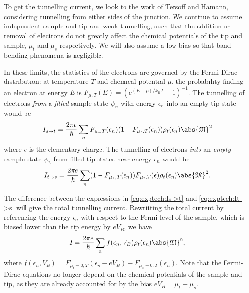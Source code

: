 To get the tunnelling current, we look to the work of Tersoff and Hamann, considering tunnelling from either sides of the junction. We continue to assume independent sample and tip and weak tunnelling, such that the addition or removal of electrons do not greatly affect the chemical potentials of the tip and sample, $\mu_t$ and $\mu_s$ respectively. We will also assume a low bias so that band-bending phenomena is negligible.

In these limits, the statistics of the electrons are governed by the Fermi-Dirac distribution: at temperature $T$ and chemical potential $\mu$, the probability finding an electron at energy $E$ is $F_{\mu, T}(E) = ({e^{(E-\mu)/k_BT} +1})^{-1}$. The tunnelling of electrons \emph{from} a \emph{filled} sample state $\psi_n$ with energy $\epsilon_n$ into an empty tip state would be
\begin{equation} \label{eq:exptech:Is->t}
    I_{s\rightarrow t} = \frac{2\pi e}{\hbar} \sum_n F_{\mu_s, T}(\epsilon_n) (1-F_{\mu_t, T}(\epsilon_n))  \rho_{t}(\epsilon_n) \abs{\mathfrak{M}}^2 
\end{equation}
where $e$ is the elementary charge. The tunnelling of electrons \emph{into} an \emph{empty} sample state $\psi_n$ from filled tip states near energy $\epsilon_n$ would be 
\begin{equation} \label{eq:exptech:It->s}
    I_{t\rightarrow s} = \frac{2\pi e}{\hbar} \sum_n (1-F_{\mu_s, T}(\epsilon_n))   F_{\mu_t, T}(\epsilon)  \rho_{t}(\epsilon_n) \abs{\mathfrak{M}}^2 .
\end{equation}

The difference between the expressions in \autoref{eq:exptech:Is->t} and \ref{eq:exptech:It->s} will give the total tunnelling current. Rewritting the total current by referencing the energy $\epsilon_n$ with respect to the Fermi level of the sample, which is biased lower than the tip energy by $eV_B$, we have
\begin{equation} 
I = \frac{2\pi e}{\hbar}\sum_n f(\epsilon_n, V_B) \rho_{t}(\epsilon_n) \abs{\mathfrak{M}}^2,
\end{equation}
where $ f(\epsilon_n,V_B) = F_{\mu_t=0,T}(\epsilon_n-eV_B) - F_{\mu_s=0,T}(\epsilon_n)$. Note that the Fermi-Dirac equations no longer depend on the chemical potentials of the sample and tip, as they are already accounted for by the bias $eV_B = \mu_t - \mu_s$. 


